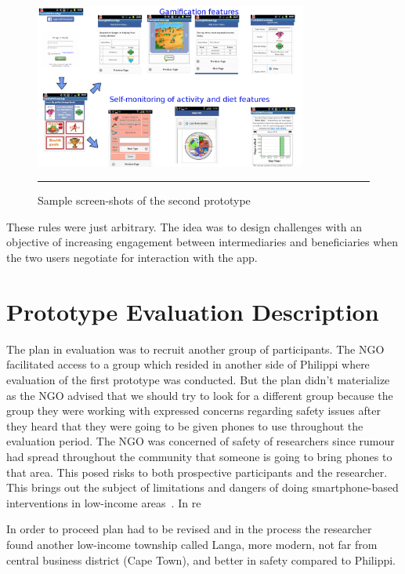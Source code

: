 \begin{figure}[htbp]
  \centering
    \includegraphics[width=0.8\textwidth]{Figures/Version2/Prototype2Screenshots.png}
    \rule{35em}{0.5pt}
  \caption{Sample screen-shots of the second prototype}
  \label{figure:prototype_2_screens}
\end{figure}

These rules were just arbitrary. The idea was to design challenges with an objective of increasing engagement between intermediaries and beneficiaries when the two users negotiate for interaction with the app.
\section{Prototype Evaluation Description}
The plan in evaluation was to recruit another group of participants. The NGO facilitated access to a group which resided in another side of Philippi where evaluation of the first prototype was conducted. But the plan didn't materialize as the NGO advised that we should try to look for a different group because the group they were working with expressed concerns regarding safety issues after they heard that they were going to be given phones to use throughout the evaluation period. The NGO was concerned of safety of researchers since rumour had spread throughout the community that someone is going to bring phones to that area. This posed risks to both prospective participants and the researcher. This brings out the subject of limitations and dangers of doing smartphone-based interventions in low-income areas~\cite{Molapo2015}. In re


In order to proceed plan had to be revised and in the process the researcher found another low-income township called Langa, more modern, not far from central business district (Cape Town), and better in safety compared to Philippi. 

